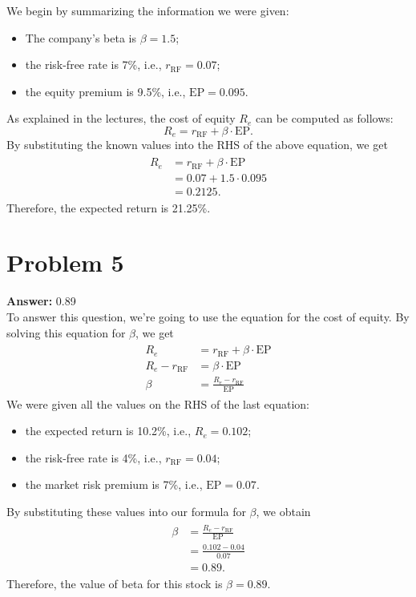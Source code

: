 \documentclass[11pt]{article}
\begin{document}
We begin by summarizing the information we were given:
\begin{itemize}
\item The company's beta is \(\beta=1.5\);
\item the risk-free rate is 7\%, i.e., \(r_{\mathrm{RF}}=0.07\);
\item the equity premium is 9.5\%, i.e., \(\mathrm{EP}=0.095\).
\end{itemize}
As explained in the lectures, the cost of equity \(R_e\) can be computed as
follows:
\begin{equation}
R_e=r_{\mathrm{RF}}+\beta\cdot\mathrm{EP}.
\end{equation}
By substituting the known values into the RHS of the above equation, we get
\begin{align}
  \begin{split}
    R_e&=r_{\mathrm{RF}}+\beta\cdot\mathrm{EP}\\
    &=0.07+1.5\cdot 0.095\\
    &=0.2125.
  \end{split}
\end{align}
Therefore, the expected return is 21.25\%.
\section*{Problem 5}
\label{sec:orgbc74e54}

\textbf{Answer:} 0.89\\

To answer this question, we're going to use the equation for the cost of equity.
By solving this equation for \(\beta\), we get
\begin{align}
  \begin{split}
    R_e&=r_{\mathrm{RF}}+\beta\cdot\mathrm{EP}\\
    R_e-r_{\mathrm{RF}}&=\beta\cdot\mathrm{EP}\\
    \beta&=\frac{R_e-r_{\mathrm{RF}}}{\mathrm{EP}}
  \end{split}
\end{align}
We were given all the values on the RHS of the last equation:
\begin{itemize}
\item the expected return is 10.2\%, i.e., \(R_e=0.102\);
\item the risk-free rate is 4\%, i.e., \(r_{\mathrm{RF}}=0.04\);
\item the market risk premium is 7\%, i.e., \(\mathrm{EP}=0.07\).
\end{itemize}
By substituting these values into our formula for \(\beta\), we obtain
\begin{align}
  \begin{split}
    \beta&=\frac{R_e-r_{\mathrm{RF}}}{\mathrm{EP}}\\
    &=\frac{0.102-0.04}{0.07}\\
    &=0.89.
  \end{split}
\end{align}
Therefore, the value of beta for this stock is \(\beta=0.89\).
\end{document}
